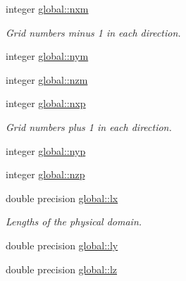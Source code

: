 \textbf{ }\par
\begin{DoxyCompactItemize}
\item 
integer \hyperlink{namespaceglobal_aa37f5fe09139707ac1723302127436b1}{global\+::nxm}
\begin{DoxyCompactList}\small\item\em Grid numbers minus 1 in each direction. \end{DoxyCompactList}\item 
integer \hyperlink{namespaceglobal_a9852876e90514ccc182c0ed0b27cdaad}{global\+::nym}
\item 
integer \hyperlink{namespaceglobal_a76e27e2001870f6606e51d33a2c70f60}{global\+::nzm}
\end{DoxyCompactItemize}

\textbf{ }\par
\begin{DoxyCompactItemize}
\item 
integer \hyperlink{namespaceglobal_a227001d8177d0295b61a39948436adaa}{global\+::nxp}
\begin{DoxyCompactList}\small\item\em Grid numbers plus 1 in each direction. \end{DoxyCompactList}\item 
integer \hyperlink{namespaceglobal_a868bbe46b97daa7ff6c962fff16bbf2f}{global\+::nyp}
\item 
integer \hyperlink{namespaceglobal_ab376cd7d790b630ad83ffcded3c56366}{global\+::nzp}
\end{DoxyCompactItemize}

\textbf{ }\par
\begin{DoxyCompactItemize}
\item 
double precision \hyperlink{namespaceglobal_ac5d2ea39fc192fbb8354e665dc91b759}{global\+::lx}
\begin{DoxyCompactList}\small\item\em Lengths of the physical domain. \end{DoxyCompactList}\item 
double precision \hyperlink{namespaceglobal_a6a6ee40bbab9e114aa217f7d8570b924}{global\+::ly}
\item 
double precision \hyperlink{namespaceglobal_a9d90050855b894304d8b4272c6a9ee71}{global\+::lz}
\end{DoxyCompactItemize}

